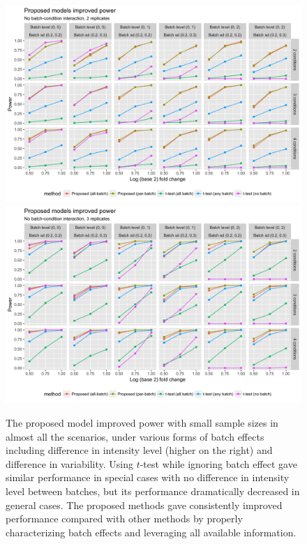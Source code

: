 \documentclass{mcp}
\begin{document}
\clearpage
\begin{figure}[h!]
\centering
\includegraphics[width=.85\textwidth]{sim/synnull_pwr_2}\\
\includegraphics[width=.85\textwidth]{sim/synnull_pwr_3}
\caption{The proposed model improved power with small sample sizes in almost all the scenarios, under various forms of batch effects including difference in intensity level (higher on the right) and difference in variability. Using $t$-test while ignoring batch effect gave similar performance in special cases with no difference in intensity level between batches, but its performance dramatically decreased in general cases. The proposed methods gave consistently improved performance compared with other methods by properly characterizing batch effects and leveraging all available information. \label{fig:synnull_pwr}}
\end{figure}
\end{document}
